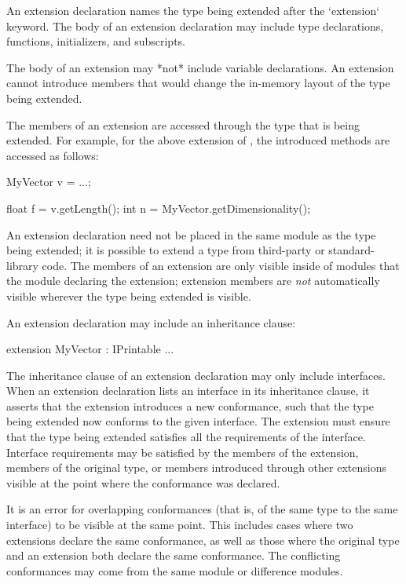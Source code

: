 An extension declaration names the type being extended after the `extension` keyword.
The body of an extension declaration may include type declarations, functions, initializers, and subscripts.

\begin{Note}
The body of an extension may *not* include variable declarations.
An extension cannot introduce members that would change the in-memory layout of the type being extended.
\end{Note}

The members of an extension are accessed through the type that is being extended.
For example, for the above extension of , the introduced methods are accessed as follows:

\begin{codeblock}
MyVector v = ...;

float f = v.getLength();
int n = MyVector.getDimensionality();
\end{codeblock}

An extension declaration need not be placed in the same module as the type being extended; it is possible to extend a type from third-party or standard-library code.
The members of an extension are only visible inside of modules that  the module declaring the extension;
extension members are \emph{not} automatically visible wherever the type being extended is visible.

An extension declaration may include an inheritance clause:

\begin{codeblock}
extension MyVector : IPrintable
{
    ...
}
\end{codeblock}

The inheritance clause of an extension declaration may only include interfaces.
When an extension declaration lists an interface in its inheritance clause, it asserts that the extension introduces a new conformance, such that the type being extended now conforms to the given interface.
The extension must ensure that the type being extended satisfies all the requirements of the interface.
Interface requirements may be satisfied by the members of the extension, members of the original type, or members introduced through other extensions visible at the point where the conformance was declared.

It is an error for overlapping conformances (that is, of the same type to the same interface) to be visible at the same point.
This includes cases where two extensions declare the same conformance, as well as those where the original type and an extension both declare the same conformance.
The conflicting conformances may come from the same module or difference modules.


